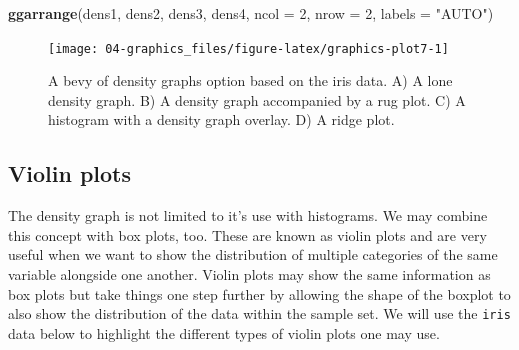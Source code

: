 \documentclass[english,10pt,a4paper,oneside]{book}
\newenvironment{Shaded}{\begin{snugshade}}{\end{snugshade}}
\newcommand{\DataTypeTok}[1]{\textcolor[rgb]{0.13,0.29,0.53}{#1}}
\newcommand{\DecValTok}[1]{\textcolor[rgb]{0.00,0.00,0.81}{#1}}
\newcommand{\KeywordTok}[1]{\textcolor[rgb]{0.13,0.29,0.53}{\textbf{#1}}}
\newcommand{\NormalTok}[1]{#1}
\newcommand{\StringTok}[1]{\textcolor[rgb]{0.31,0.60,0.02}{#1}}
\theoremstyle{definition}
\theoremstyle{definition}
\theoremstyle{definition}
\theoremstyle{remark}
\begin{document}
\begin{Shaded}
\begin{Highlighting}[]
\KeywordTok{ggarrange}\NormalTok{(dens1, dens2, dens3, dens4, }\DataTypeTok{ncol =} \DecValTok{2}\NormalTok{, }\DataTypeTok{nrow =} \DecValTok{2}\NormalTok{, }\DataTypeTok{labels =} \StringTok{"AUTO"}\NormalTok{)}
\end{Highlighting}
\end{Shaded}

\begin{figure}
\texttt{[image: 04-graphics\_files/figure-latex/graphics-plot7-1]} \caption{A bevy of density graphs option based on the iris data. A) A lone density graph. B) A density graph accompanied by a rug plot. C) A histogram with a density graph overlay. D) A ridge plot.}\label{fig:graphics-plot7}
\end{figure}

\hypertarget{violin-plots}{%
\subsection{Violin plots}\label{violin-plots}}

The density graph is not limited to it's use with histograms. We may
combine this concept with box plots, too. These are known as violin
plots and are very useful when we want to show the distribution of
multiple categories of the same variable alongside one another. Violin
plots may show the same information as box plots but take things one
step further by allowing the shape of the boxplot to also show the
distribution of the data within the sample set. We will use the
\texttt{iris} data below to highlight the different types of violin
plots one may use.
\end{document}
